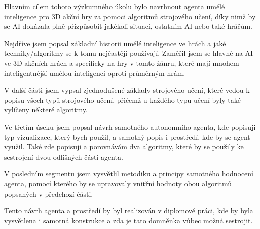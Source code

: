 Hlavním cílem tohoto výzkumného úkolu bylo navrhnout agenta umělé inteligence pro 3D akční hry za pomoci algoritmů strojového učení, díky nimž by se AI dokázala plně přizpůsobit jakékoli situaci, ostatním AI nebo také hráčům.

Nejdříve jsem popsal základní historii umělé inteligence ve hrách a jaké techniky/algoritmy se k tomu nejčastěji používají. Zaměřil jsem se hlavně na AI ve 3D akčních hrách a specificky na hry v tomto žánru, které mají mnohem inteligentnější umělou inteligenci oproti průměrným hrám.

V další části jsem vypsal zjednodušené základy strojového učení, které vedou k popisu všech typů strojového učení, přičemž u každého typu učení byly také vylíčeny některé algoritmy.

Ve třetím úseku jsem popsal návrh samotného autonomního agenta, kde popisuji typ vizualizace, který bych použil, a samotný popis i prostředí, kde by se agent využil. Také zde popisuji a porovnávám dva algoritmy, které by se použily ke sestrojení dvou odlišných částí agenta.

V posledním segmentu jsem vysvětlil metodiku a principy samotného hodnocení agenta, pomocí kterého by se upravovaly vnitřní hodnoty obou algoritmů popsaných v předchozí části.

Tento návrh agenta a prostředí by byl realizován v diplomové práci, kde by byla vysvětlena i samotná konstrukce a zda je tato domněnka vůbec možná sestrojit.